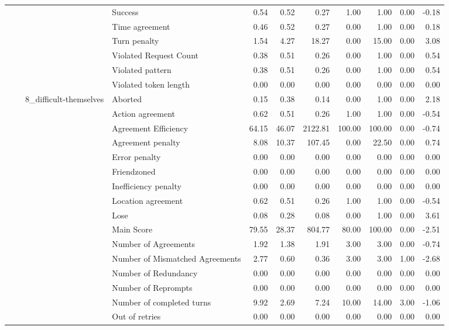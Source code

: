 \begin{tabular}{llllrrrrrrr}
 &  &  & Success & 0.54 & 0.52 & 0.27 & 1.00 & 1.00 & 0.00 & -0.18 \\
 &  &  & Time agreement & 0.46 & 0.52 & 0.27 & 0.00 & 1.00 & 0.00 & 0.18 \\
 &  &  & Turn penalty & 1.54 & 4.27 & 18.27 & 0.00 & 15.00 & 0.00 & 3.08 \\
 &  &  & Violated Request Count & 0.38 & 0.51 & 0.26 & 0.00 & 1.00 & 0.00 & 0.54 \\
 &  &  & Violated pattern & 0.38 & 0.51 & 0.26 & 0.00 & 1.00 & 0.00 & 0.54 \\
 &  &  & Violated token length & 0.00 & 0.00 & 0.00 & 0.00 & 0.00 & 0.00 & 0.00 \\
\cline{3-11}
 &  & \multirow[t]{27}{*}{8_difficult-themselves} & Aborted & 0.15 & 0.38 & 0.14 & 0.00 & 1.00 & 0.00 & 2.18 \\
 &  &  & Action agreement & 0.62 & 0.51 & 0.26 & 1.00 & 1.00 & 0.00 & -0.54 \\
 &  &  & Agreement Efficiency & 64.15 & 46.07 & 2122.81 & 100.00 & 100.00 & 0.00 & -0.74 \\
 &  &  & Agreement penalty & 8.08 & 10.37 & 107.45 & 0.00 & 22.50 & 0.00 & 0.74 \\
 &  &  & Error penalty & 0.00 & 0.00 & 0.00 & 0.00 & 0.00 & 0.00 & 0.00 \\
 &  &  & Friendzoned & 0.00 & 0.00 & 0.00 & 0.00 & 0.00 & 0.00 & 0.00 \\
 &  &  & Inefficiency penalty & 0.00 & 0.00 & 0.00 & 0.00 & 0.00 & 0.00 & 0.00 \\
 &  &  & Location agreement & 0.62 & 0.51 & 0.26 & 1.00 & 1.00 & 0.00 & -0.54 \\
 &  &  & Lose & 0.08 & 0.28 & 0.08 & 0.00 & 1.00 & 0.00 & 3.61 \\
 &  &  & Main Score & 79.55 & 28.37 & 804.77 & 80.00 & 100.00 & 0.00 & -2.51 \\
 &  &  & Number of Agreements & 1.92 & 1.38 & 1.91 & 3.00 & 3.00 & 0.00 & -0.74 \\
 &  &  & Number of Mismatched Agreements & 2.77 & 0.60 & 0.36 & 3.00 & 3.00 & 1.00 & -2.68 \\
 &  &  & Number of Redundancy & 0.00 & 0.00 & 0.00 & 0.00 & 0.00 & 0.00 & 0.00 \\
 &  &  & Number of Reprompts & 0.00 & 0.00 & 0.00 & 0.00 & 0.00 & 0.00 & 0.00 \\
 &  &  & Number of completed turns & 9.92 & 2.69 & 7.24 & 10.00 & 14.00 & 3.00 & -1.06 \\
 &  &  & Out of retries & 0.00 & 0.00 & 0.00 & 0.00 & 0.00 & 0.00 & 0.00 \\

\end{tabular}
